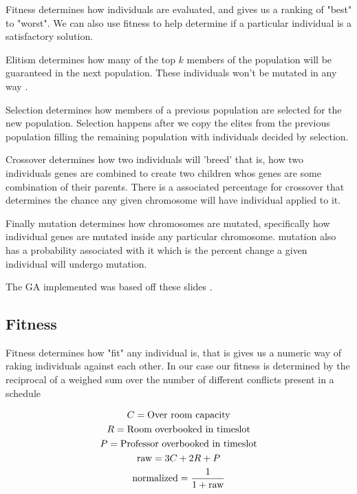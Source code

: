 \documentclass[conference]{IEEEtran}
\begin{document}
Fitness determines how individuals are evaluated, and gives us a ranking of "best" to "worst". We can also use fitness to help determine if a particular individual is a satisfactory solution.\vspace{8pt}

Elitism determines how many of the top $k$ members of the population will be guaranteed in the next population. These individuals won't be mutated in any way \cite[p. 7]{ga-tut1}.\vspace{8pt}

Selection determines how members of a previous population are selected for the new population. Selection happens after we copy the elites from the previous population filling the remaining population with individuals decided by selection\cite[p. 9]{ga-tut1}. \vspace{8pt}

Crossover determines how two individuals will 'breed' that is, how two individuals genes are combined to create two children whos genes are some combination of their parents. There is a associated percentage for crossover that determines the chance any given chromosome will have individual applied to it\cite[p. 12]{ga-tut1}.\vspace{8pt}

Finally mutation determines how chromosomes are mutated, specifically how individual genes are mutated inside any particular chromosome. mutation also has a probability associated with it which is the percent change a given individual will undergo mutation.\vspace{8pt}

The GA implemented was based off these slides \cite{ga-tut1}.

\subsection{Fitness}
Fitness determines how "fit" any individual is, that is gives us a numeric way of raking individuals against each other. In our case our fitness is determined by the reciprocal of a weighed sum over the number of different conflicts present in a schedule


\begin{gather}
C=\text{Over room capacity} \notag\\
R=\text{Room overbooked in timeslot} \notag\\
P=\text{Professor overbooked in timeslot} \notag\\
\text{raw}=3C+2R+P\label{raw}\\
\text{normalized}=\frac{1}{1+\text{raw}}\label{normalized}
\end{gather}
\end{document}

